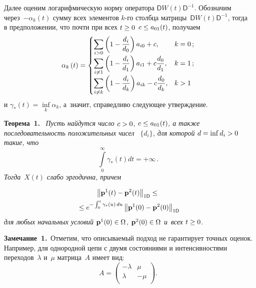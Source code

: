 \begin{multicols}{2}
Далее оценим логарифмическую норму оператора $ \textsf{D} W(t) \textsf{D}^{-1}$. 
Обозначим через~$ -\alpha_{k}(t) $ сумму всех элементов $k$-го столбца 
матрицы~$ \textsf{D} W(t) \textsf{D}^{-1} $, тогда в предположении, что почти 
при всех $t \hm\ge 0$ $c \hm\le a_{01}(t)$,  получаем
\begin{equation}
    \alpha_{k}\left( t\right) =
    \begin{cases}
            \displaystyle   \sum\limits_{i > 0}\left(1-\displaystyle\frac{\displaystyle d_i\mathstrut}{\displaystyle d_0\mathstrut}\right)a_{i0} + c, & k= 0\,;\\
             \displaystyle  \sum\limits_{i \neq 1}\left(1-\displaystyle\frac{\displaystyle d_i\mathstrut}{\displaystyle d_1\mathstrut}\right)a_{i1} + c\displaystyle\frac{\displaystyle d_0\mathstrut}{\displaystyle d_1\mathstrut}, & k = 1\,;\\
           \displaystyle    \sum\limits_{i \neq k}\left(1-\displaystyle\frac{\displaystyle d_i\mathstrut}{\displaystyle d_k\mathstrut}\right)a_{ik} -  c\displaystyle\frac{\displaystyle d_0\mathstrut}{\displaystyle d_k\mathstrut}, & k > 1\\
    \end{cases}
    \label{2112}
\end{equation}
и $ \gamma_{*}(t) = \inf\limits_k \alpha_{k} $, а~значит, справедливо  следующее 
утверждение.

\smallskip

\noindent
\textbf{Теорема~1.}\ %
\textit{Пусть найдутся число $c\hm >0$, $c \hm\le  a_{01}(t)$, а 
также последовательность положительных чисел~ $\{d_i\}$, для которой $d\hm=\inf d_i 
\hm>0$ такие, что  
$$
\int\limits_0^\infty \gamma_{*}(t) dt = +\infty\,.
$$
 Тогда~$X(t)$ слабо  
эргодична, причем}

\vspace*{-2pt}

\noindent
    \begin{multline}
        \left\|{\mathbf p}^{1}(t)-{\mathbf p}^{2}(t)\right\|_{1\textsf{D}} \le{}\\
        {}\le
        e^{-\int_0^t\gamma_{*}(u) \,du}\left\| {\mathbf p}^{1}(0)-
{\mathbf p}^{2}(0)\right\|_{1\textsf{D}} 
\label{f12}
    \end{multline}
\textit{для любых начальных условий $ \vp^{1}(0) \hm\in \Omega$, 
$\vp^{2}(0)\hm\in \Omega$ и~всех $t \hm\ge 0$}.


\smallskip

\noindent
\textbf{Замечание~1.}\
 Отметим, что описываемый подход  не гарантирует точных оценок. Например, для 
однородной цепи с двумя состояниями и интенсивностями переходов~$\lambda$ и~$\mu$ матрица~$A$ имеет вид:
\begin{equation*}
A = \left(
    \begin{array}{cc}
        -\lambda & \mu  \\[2pt]
                \lambda & -\mu  \\
    \end{array}
    \right).
\end{equation*}



\end{multicols}
